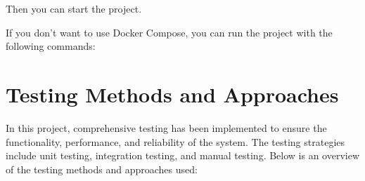\documentclass[letterpaper,10pt,english]{sphinxmanual}
\begin{document}
\sphinxAtStartPar
Then you can start the project.

\begin{sphinxVerbatim}[commandchars=\\\{\}]
\end{sphinxVerbatim}

\sphinxAtStartPar
If you don’t want to use Docker Compose, you can run the project with the following commands:

\begin{sphinxVerbatim}[commandchars=\\\{\}]







\end{sphinxVerbatim}

\sphinxstepscope


\chapter{Testing Methods and Approaches}
\label{\detokenize{modules/testing:testing-methods-and-approaches}}\label{\detokenize{modules/testing::doc}}
\sphinxAtStartPar
In this project, comprehensive testing has been implemented to ensure the functionality, performance, and reliability of the system. The testing strategies include unit testing, integration testing, and manual testing. Below is an overview of the testing methods and approaches used:
\end{document}
